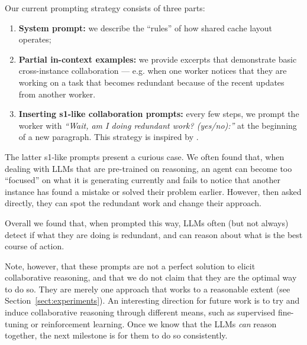 Our current prompting strategy consists of three parts:\begin{enumerate}
    \item \textbf{System prompt:} we describe the ``rules'' of how shared cache layout operates;
    \item \textbf{Partial in-context examples:} we provide excerpts that demonstrate basic cross-instance collaboration --- e.g. when one worker notices that they are working on a task that becomes redundant because of the recent updates from another worker.
    \item \textbf{Inserting s1-like collaboration prompts:} every few steps, we prompt the worker with \textit{``Wait, am I doing redundant work? (yes/no):''} at the beginning  of a new paragraph. This strategy is inspired by \cite{muennighoff2025s1}.
\end{enumerate}

The latter s1-like prompts present a curious case. We often found that, when dealing with LLMs that are pre-trained on reasoning, an agent can  become too ``focused'' on what it is generating currently and fails to notice that another instance has found a mistake or solved their problem earlier. However, then asked directly, they can spot the redundant work and change their approach.

Overall we found that, when prompted this way, LLMs 
often (but not always) detect if what they are doing is redundant, and can reason about what is the best course of action. %

Note, however, that these prompts are not a perfect solution to elicit collaborative reasoning, and that we do not claim that they are the optimal way to do so. They are merely one approach that works to a reasonable extent (see Section~\ref{sect:experiments}). An interesting direction for future work is to try and induce collaborative reasoning through different means, such as supervised fine-tuning or reinforcement learning. Once we know that the LLMs \textit{can} reason together, the next milestone is for them to do so consistently.

